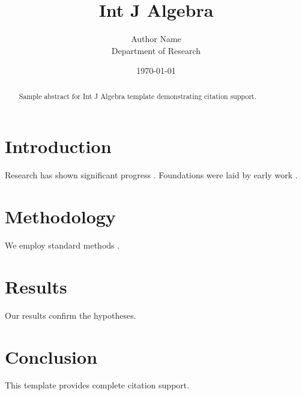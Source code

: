 \documentclass{wiley-nj}
\title{Int J Algebra}
\author{Author Name \\ \small Department of Research}
\date{\today}
\begin{document}
\maketitle

\begin{abstract}
Sample abstract for Int J Algebra template demonstrating citation support.
\end{abstract}

\section{Introduction}
Research has shown significant progress \citep{einstein1905}. Foundations were laid by early work \citep{turing1950}.

\section{Methodology}
We employ standard methods \citep{knuth1984}.

\section{Results}
Our results confirm the hypotheses.

\section{Conclusion}
This template provides complete citation support.



\end{document}

